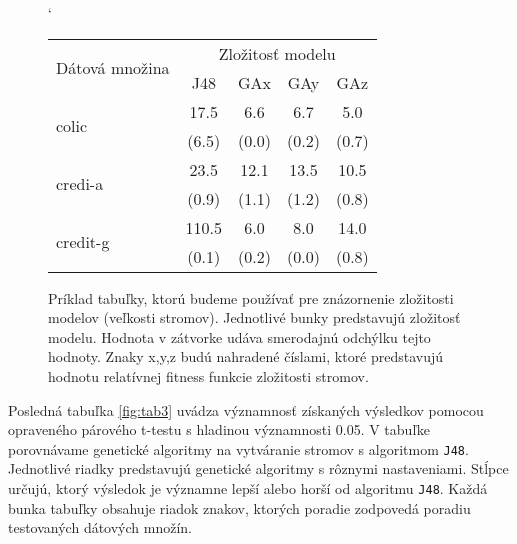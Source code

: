 \begin{figure}[h]
\catcode`
\centering 
\newcommand\T{\rule{0pt}{2.6ex}}       %
\newcommand\B{\rule[-1.2ex]{0pt}{0pt}} %
\begin{tabular}{|l||c|c|c|c||}
\hline \multirow{2}{*}{Dátová množina} & \multicolumn{4}{|c||}{Zložitosť modelu} \\ 
\cline{2-5} & J48 & GAx & GAy & GAz \\
\hline
\hline \multirow{2}{*}{colic} & 17.5 & 6.6 & 6.7 & 5.0 \T\\[-1.5ex]
& \tiny (6.5) & \tiny (0.0) & \tiny (0.2) & \tiny (0.7)\B\\
\hline \multirow{2}{*}{credi-a} & 23.5 & 12.1 & 13.5 & 10.5 \T\\[-1.5ex]
& \tiny (0.9) & \tiny (1.1) & \tiny (1.2) & \tiny (0.8)\B\\
\hline \multirow{2}{*}{credit-g} & 110.5 & 6.0 & 8.0 & 14.0 \T\\[-1.5ex]
& \tiny (0.1) & \tiny (0.2) & \tiny (0.0) & \tiny (0.8)\B\\
\hline
\end{tabular}
\caption{Príklad tabuľky, ktorú budeme používať pre znázornenie zložitosti modelov (veľkosti stromov). Jednotlivé bunky predstavujú zložitosť modelu. Hodnota v zátvorke udáva smerodajnú odchýlku tejto hodnoty. Znaky x,y,z budú nahradené číslami, ktoré predstavujú hodnotu relatívnej fitness funkcie zložitosti stromov.}\label{fig:tab2}
\end{figure}

Posledná tabuľka \ref{fig:tab3} uvádza významnosť získaných výsledkov pomocou opraveného párového t-testu s hladinou významnosti 0.05. V tabuľke porovnávame genetické algoritmy na vytváranie stromov s algoritmom \verb|J48|. Jednotlivé riadky predstavujú genetické algoritmy s rôznymi nastaveniami. Stĺpce určujú, ktorý výsledok je významne lepší alebo horší od algoritmu \verb|J48|. Každá bunka tabuľky obsahuje riadok znakov, ktorých poradie zodpovedá poradiu testovaných dátových množín.

